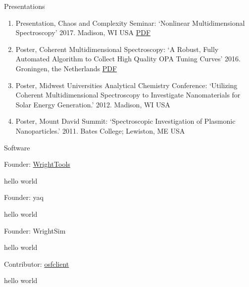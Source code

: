\documentclass{resume}  %
\begin{document}
\begin{rSection}{Presentations}
  \begin{enumerate}[leftmargin = 0 pt]
    \item Presentation, Chaos and Complexity Seminar:
      `Nonlinear Multidimensional Spectroscopy'
      2017. Madison, WI USA
      \href{https://github.com/untzag/CV/raw/master/supplementary/2017-11-07\%20chaos.pdf}{PDF}
    \item Poster, Coherent Multidimensional Spectroscopy:
      `A Robust, Fully Automated Algorithm to Collect High Quality OPA Tuning Curves'
      2016. Groningen, the Netherlands
      \href{https://github.com/untzag/CV/raw/master/supplementary/2016-06-01\%20CMDS.pdf}{PDF}
    \item Poster, Midwest Universities Analytical Chemistry Conference:
      `Utilizing Coherent Multidimensional Spectroscopy to Investigate Nanomaterials for Solar Energy
      Generation.'
      2012. Madison, WI USA
    \item Poster, Mount David Summit:
      `Spectroscopic Investigation of Plasmonic Nanoparticles.'
      2011. Bates College; Lewiston, ME USA
  \end{enumerate}
\end{rSection}

\begin{rSection}{Software}
  \begin{rSubsection}{Founder: \href{http://wright.tools}{WrightTools}}{}{}{}
    \item hello world
  \end{rSubsection}
  \begin{rSubsection}{Founder: yaq}{}{}{}
    \item hello world
  \end{rSubsection}
  \begin{rSubsection}{Founder: WrightSim}{}{}{}
    \item hello world
  \end{rSubsection}
  \begin{rSubsection}{Contributor: \href{https://github.com/dib-lab/osf-cli}{osfclient}}{}{}{}
    \item hello world
  \end{rSubsection}
\end{rSection}
\end{document}
